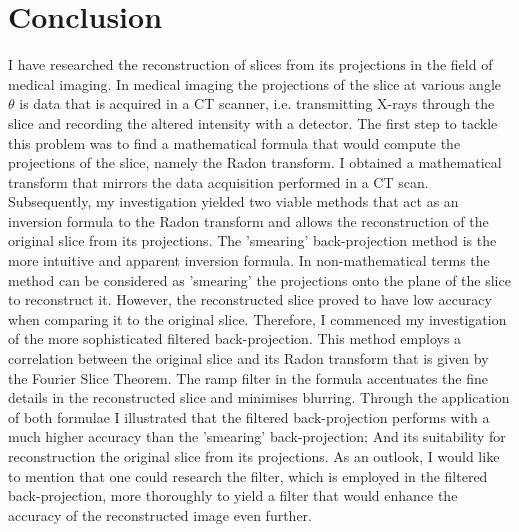 \documentclass[12pt]{article}
\begin{document}
\section{Conclusion}
I have researched the reconstruction of slices from its projections in the field of medical imaging. In medical imaging the projections of the slice at various angle $\theta$ is data that is acquired in a CT scanner, i.e. transmitting X-rays through the slice and recording the altered intensity with a detector. The first step to tackle this problem was to find a mathematical formula that would compute the projections of the slice, namely the Radon transform. I obtained a mathematical transform that mirrors the data acquisition performed in a CT scan. Subsequently, my investigation yielded two viable methods that act as an inversion formula to the Radon transform and allows the reconstruction of the original slice from its projections. The 'smearing' back-projection method is the more intuitive and apparent inversion formula. In non-mathematical terms the method can be considered as 'smearing' the projections onto the plane of the slice to reconstruct it. However, the reconstructed slice proved to have low accuracy when comparing it to the original slice. Therefore, I commenced my investigation of the more sophisticated filtered back-projection. This method employs a correlation between the original slice and its Radon transform that is given by the Fourier Slice Theorem. The ramp filter in the formula accentuates the fine details in the reconstructed slice and minimises blurring.  Through the application of both formulae I illustrated that the filtered back-projection performs with a much higher accuracy than the 'smearing' back-projection; And its suitability for reconstruction the original slice from its projections. As an outlook, I would like to mention that one could research the filter, which is employed in the filtered back-projection, more thoroughly to yield a filter that would enhance the accuracy of the reconstructed image even further.

\clearpage
\end{document}
